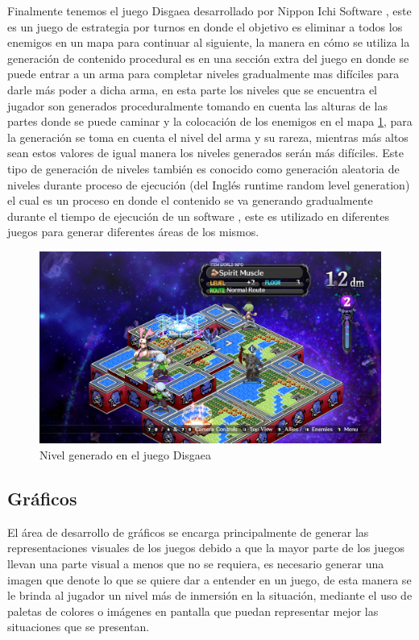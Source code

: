 Finalmente tenemos el juego Disgaea desarrollado por Nippon Ichi
Software \cite{DisgaeaAndrew2008}, este es un juego de estrategia por turnos en %
donde el objetivo es eliminar a todos los enemigos en un mapa para continuar al
siguiente, la manera en cómo se utiliza la generación de contenido procedural es
en una sección extra del juego en donde se puede entrar a un arma para completar
niveles gradualmente mas difíciles para darle más poder a dicha arma, en esta
parte los niveles que se encuentra el jugador son generados proceduralmente
tomando en cuenta las alturas de las partes donde se puede caminar y la
colocación de los enemigos en el mapa \ref{figure:DisgaeaIW}, para la generación
se toma en cuenta el nivel del arma y su rareza, mientras más altos sean estos
valores de igual manera los niveles generados serán más difíciles. Este tipo de
generación de niveles también es conocido como generación aleatoria de niveles
durante proceso de ejecución (del Inglés runtime random level generation) el
cual es un proceso en donde el contenido se va generando gradualmente durante el
tiempo de ejecución de un software \cite{RuntimeLevelAndrew2008}, este es
utilizado en diferentes juegos para generar diferentes áreas de los mismos.

\begin{figure}
    \centering
    \includegraphics[width=1.0\textwidth]{img/DisgaeaIW.png}
    \caption{Nivel generado en el juego Disgaea}
    \label{figure:DisgaeaIW}
\end{figure}

\subsection{Gráficos}
\label{subsection:Visuals}

El área de desarrollo de gráficos se encarga principalmente de generar las
representaciones visuales de los juegos debido a que la mayor parte de los
juegos llevan una parte visual a menos que no se requiera, es necesario generar
una imagen que denote lo que se quiere dar a entender en un juego, de esta
manera se le brinda al jugador un nivel más de inmersión en la situación,
mediante el uso de paletas de colores o imágenes en pantalla que puedan
representar mejor las situaciones que se presentan.

